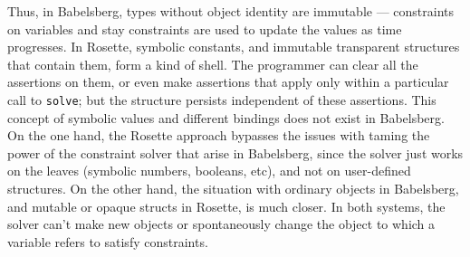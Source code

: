 \documentclass{sig-alternate-05-2015}
\begin{document}
Thus, in Babelsberg, types without object identity are immutable ---
constraints on variables and stay constraints are used to update the values
as time progresses.  In Rosette, symbolic constants, and immutable
transparent structures that contain them, form a kind of shell.  The
programmer can clear all the assertions on them, or even make assertions
that apply only within a particular call to \verb|solve|; but the structure
persists independent of these assertions.
This concept of symbolic
values and different bindings does not exist in Babelsberg.  On the one
hand, the Rosette approach bypasses the issues with taming the power of the
constraint solver that arise in Babelsberg, since the solver just works on
the leaves (symbolic numbers, booleans, etc), and not on user-defined
structures.  On the other hand, the situation with ordinary objects in
Babelsberg, and mutable or opaque structs in Rosette, is much closer.  In
both systems, the solver can't make new objects or spontaneously change the
object to which a variable refers to satisfy constraints.




\end{document}
